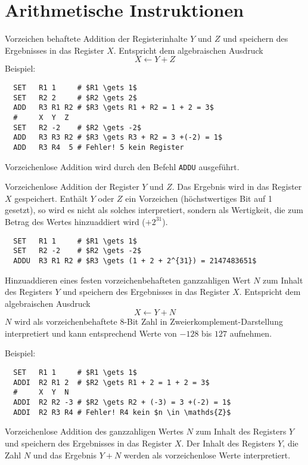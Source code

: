 \section{Arithmetische Instruktionen} 

Vorzeichen behaftete Addition der Registerinhalte $Y$ und $Z$ und
speichern des Ergebnisses in das Register $X$. Entspricht dem algebraischen
Ausdruck
\[
    X \gets Y + Z
\]
Beispiel:
\begin{lstlisting}
  SET   R1 1     # $R1 \gets 1$
  SET   R2 2     # $R2 \gets 2$
  ADD   R3 R1 R2 # $R3 \gets R1 + R2 = 1 + 2 = 3$
  #     X  Y  Z
  SET   R2 -2    # $R2 \gets -2$
  ADD   R3 R3 R2 # $R3 \gets R3 + R2 = 3 +(-2) = 1$
  ADD   R3 R4  5 # Fehler! 5 kein Register
\end{lstlisting}
Vorzeichenlose Addition wird durch den Befehl \texttt{ADDU} ausgeführt.


Vorzeichenlose Addition der Register $Y$ und $Z$. Das Ergebnis wird in das
Register $X$ gespeichert. Enthält $Y$ oder $Z$ ein Vorzeichen (höchstwertiges
Bit auf 1 gesetzt), so wird es nicht als solches interpretiert, sondern als
Wertigkeit, die zum Betrag des Wertes hinzuaddiert wird ($+2^{31}$).

\begin{lstlisting}
  SET   R1 1     # $R1 \gets 1$
  SET   R2 -2    # $R2 \gets -2$
  ADDU  R3 R1 R2 # $R3 \gets (1 + 2 + 2^{31}) = 2147483651$
\end{lstlisting}



Hinzuaddieren eines festen vorzeichenbehafteten ganzzahligen Wert $N$ zum Inhalt
des Registers $Y$ und speichern des Ergebnisses in das Register $X$.
Entspricht dem algebraischen Ausdruck
\[
  X \gets Y + N
\]
$N$ wird als vorzeichenbehaftete 8-Bit Zahl in Zweierkomplement-Darstellung
interpretiert und kann entsprechend Werte von $-128$ bis $127$ aufnehmen.

Beispiel:
\begin{lstlisting}
  SET   R1 1     # $R1 \gets 1$
  ADDI  R2 R1 2  # $R2 \gets R1 + 2 = 1 + 2 = 3$
  #     X  Y  N
  ADDI  R2 R2 -3 # $R2 \gets R2 + (-3) = 3 +(-2) = 1$
  ADDI  R2 R3 R4 # Fehler! R4 kein $n \in \mathds{Z}$
\end{lstlisting}



Vorzeichenlose Addition des ganzzahligen Wertes $N$ zum Inhalt des Registers $Y$
und speichern des Ergebnisses in das Register $X$.
Der Inhalt des Registers $Y$, die Zahl $N$ und das Ergebnis $Y + N$ werden als
vorzeichenlose Werte interpretiert.














